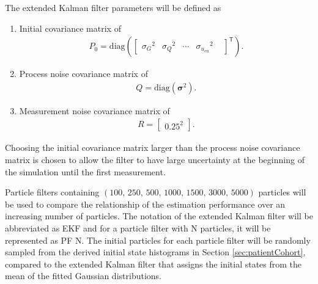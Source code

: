 \documentclass[nomenclature, english, bibtex]{kththesis}
\begin{document}

The extended Kalman filter parameters will be defined as
\begin{enumerate}
  \item Initial covariance matrix of
  \begin{align} 
    P_0= \mathrm{diag}\left(\begin{bmatrix}
    {\sigma_G}^2 &
    {\sigma_Q}^2 &
    \cdots &
    {\sigma_{u_{en}}}^2&
\end{bmatrix}^{\mathsf{T}}
    \right).
  \end{align}

  \item Process noise covariance matrix of 
    \begin{align}
        Q = \mathrm{diag}(\bm \sigma ^2).
    \end{align} 
    \item Measurement noise covariance matrix of 
    \begin{align}
        R = \begin{bmatrix}
            0.25^2
        \end{bmatrix}.
    \end{align}
\end{enumerate}
Choosing the initial covariance matrix larger than the process noise covariance matrix is chosen to allow the filter to have large uncertainty at the beginning of the simulation until the first measurement.

Particle filters containing $\left(100,\,250,\,500,\,1000,\,1500, \,3000, \,5000\right)$
particles will be used to compare the relationship of the estimation performance over an increasing number of particles. The notation of the extended Kalman filter will be abbreviated as EKF and for a particle filter with N particles, it will be represented as PF N. The initial particles for each particle filter will be randomly sampled from the derived initial state histograms in Section \ref{sec:patientCohort}, compared to the extended Kalman filter that assigns the initial states from the mean of the fitted Gaussian distributions. 
\end{document}
